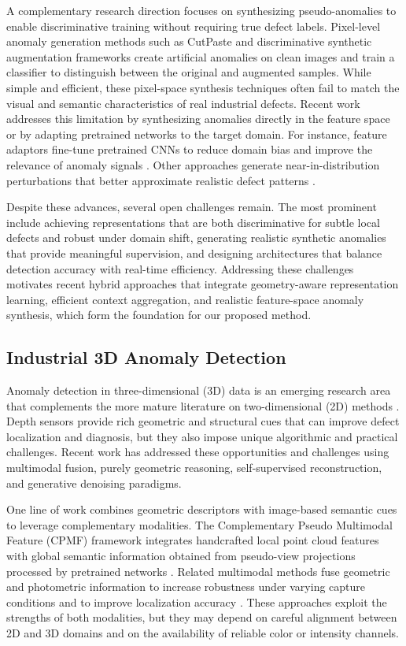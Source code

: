 A complementary research direction focuses on synthesizing pseudo-anomalies to enable discriminative training without requiring true defect labels. Pixel-level anomaly generation methods such as CutPaste \cite{li2021cutpaste} and discriminative synthetic augmentation frameworks \cite{zavrtanik2021draem} create artificial anomalies on clean images and train a classifier to distinguish between the original and augmented samples. While simple and efficient, these pixel-space synthesis techniques often fail to match the visual and semantic characteristics of real industrial defects. Recent work addresses this limitation by synthesizing anomalies directly in the feature space or by adapting pretrained networks to the target domain. For instance, feature adaptors fine-tune pretrained CNNs to reduce domain bias and improve the relevance of anomaly signals \cite{liu2023simplenet}. Other approaches generate near-in-distribution perturbations that better approximate realistic defect patterns \cite{zavrtanik2022dsr, fang2023fastrecon, zhang2024realnet}.

Despite these advances, several open challenges remain. The most prominent include achieving representations that are both discriminative for subtle local defects and robust under domain shift, generating realistic synthetic anomalies that provide meaningful supervision, and designing architectures that balance detection accuracy with real-time efficiency. Addressing these challenges motivates recent hybrid approaches that integrate geometry-aware representation learning, efficient context aggregation, and realistic feature-space anomaly synthesis, which form the foundation for our proposed method.

\subsection{Industrial 3D Anomaly Detection}

Anomaly detection in three-dimensional (3D) data is an emerging research area that complements the more mature literature on two-dimensional (2D) methods \cite{horwitz2023back}. Depth sensors provide rich geometric and structural cues that can improve defect localization and diagnosis, but they also impose unique algorithmic and practical challenges. Recent work has addressed these opportunities and challenges using multimodal fusion, purely geometric reasoning, self-supervised reconstruction, and generative denoising paradigms.

One line of work combines geometric descriptors with image-based semantic cues to leverage complementary modalities. The Complementary Pseudo Multimodal Feature (CPMF) framework integrates handcrafted local point cloud features with global semantic information obtained from pseudo-view projections processed by pretrained networks \cite{cao2024complementary}. Related multimodal methods fuse geometric and photometric information to increase robustness under varying capture conditions and to improve localization accuracy \cite{wang2023multimodal, rudolph2023asymmetric}. These approaches exploit the strengths of both modalities, but they may depend on careful alignment between 2D and 3D domains and on the availability of reliable color or intensity channels.

